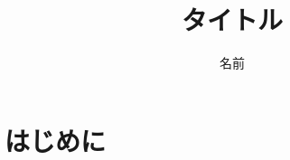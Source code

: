 \documentclass{jsarticle}
\title{タイトル}
\author{名前} %
\begin{document}
\maketitle

\tableofcontents

\section{はじめに}
\end{document}
